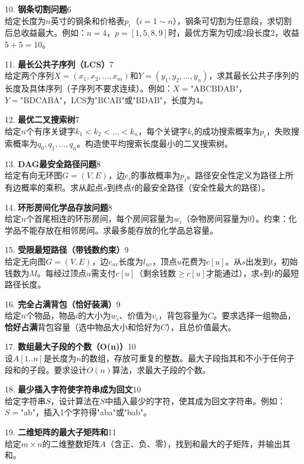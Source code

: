 \vspace{8pt}
10. \textbf{钢条切割问题}\hfill 6\\
给定长度为$n$英寸的钢条和价格表$p_i$（$i=1 \sim n$），钢条可切割为任意段，求切割后总收益最大。例如：$n=4$，$p=[1,5,8,9]$时，最优方案为切成2段长度2，收益$5+5=10$。

\columnbreak
\vspace{8pt}
11. \textbf{最长公共子序列（LCS）}\hfill 7\\
给定两个序列$X=(x_1,x_2,\ldots,x_m)$和$Y=(y_1,y_2,\ldots,y_n)$，求其最长公共子序列的长度及具体序列（子序列不要求连续）。例如：$X=\text{"ABCBDAB"}$，$Y=\text{"BDCABA"}$，LCS为$\text{"BCAB"}$或$\text{"BDAB"}$，长度为4。

\vspace{8pt}
12. \textbf{最优二叉搜索树}\hfill 7\\
给定$n$个有序关键字$k_1 < k_2 < \ldots < k_n$，每个关键字$k_i$的成功搜索概率为$p_i$，失败搜索概率为$q_0,q_1,\ldots,q_n$。构造使平均搜索长度最小的二叉搜索树。

\vspace{8pt}
13. \textbf{DAG最安全路径问题}\hfill 8\\
给定有向无环图$G=(V,E)$，边$e_i$的事故概率为$p_i$。路径安全性定义为路径上所有边概率的乘积。求从起点$s$到终点$t$的最安全路径（安全性最大的路径）。

\vspace{8pt}
14. \textbf{环形房间化学品存放问题}\hfill 8\\
给定$n$个首尾相连的环形房间，每个房间容量为$w_i$（杂物房间容量为0）。约束：化学品不能存放在相邻房间。求最多能存放的化学品总容量。

\vspace{8pt}
15. \textbf{受限最短路径（带钱数约束）}\hfill 9\\
给定无向图$G=(V,E)$，边$e_{uv}$长度为$l_{uv}$，顶点$u$花费为$c[u]$。从$s$出发到$t$，初始钱数为$M$。每经过顶点$u$需支付$c[u]$（剩余钱数$\ge c[u]$才能通过），求$s$到$t$的最短路径长度。

\vspace{8pt}
16. \textbf{完全占满背包（恰好装满）}\hfill 9\\
给定$n$个物品，物品$i$的大小为$w_i$、价值为$v_i$，背包容量为$C$。要求选择一组物品，\textbf{恰好占满}背包容量（选中物品大小和恰好为$C$），且总价值最大。

\vspace{8pt}
17. \textbf{数组最大子段的个数（O(n)）}\hfill 10\\
设$A[1..n]$是长度为$n$的数组，存放可重复的整数。最大子段指其和不小于任何子段和的子段。要求设计$O(n)$算法，求最大子段的个数。

\vspace{8pt}
18. \textbf{最少插入字符使字符串成为回文}\hfill 10\\
给定字符串$S$，设计算法在$S$中插入最少的字符，使其成为回文字符串。例如：$S=\text{"ab"}$，插入1个字符得"aba"或"bab"。

\vspace{8pt}
19. \textbf{二维矩阵的最大子矩阵和}\hfill 11\\
给定$m \times n$的二维整数矩阵$A$（含正、负、零），找到和最大的子矩阵，并输出其和。
